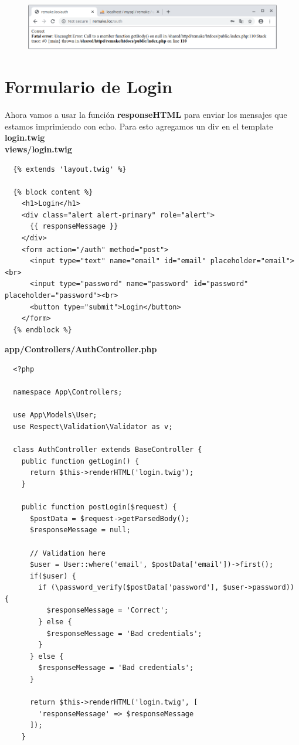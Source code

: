 \documentclass{article}
\begin{document}
\begin{figure}[h!]
  \centering
  \includegraphics[scale=0.5]{./Pictures/205_login_correct.png}
\end{figure}

\newpage

\section{Formulario de Login}%

Ahora vamos a usar la función \textbf{responseHTML} para enviar los mensajes
que estamos imprimiendo con echo. Para esto agregamos un div en el template
\textbf{login.twig}\\

\textbf{views/login.twig}
\begin{verbatim}
  {% extends 'layout.twig' %}

  {% block content %}
    <h1>Login</h1>
    <div class="alert alert-primary" role="alert">
      {{ responseMessage }}
    </div>
    <form action="/auth" method="post">
      <input type="text" name="email" id="email" placeholder="email"><br>
      <input type="password" name="password" id="password" placeholder="password"><br>
      <button type="submit">Login</button>
    </form>
  {% endblock %}
\end{verbatim}

\textbf{app/Controllers/AuthController.php}
\begin{verbatim}
  <?php

  namespace App\Controllers;

  use App\Models\User;
  use Respect\Validation\Validator as v;

  class AuthController extends BaseController {
    public function getLogin() {
      return $this->renderHTML('login.twig');
    }

    public function postLogin($request) {
      $postData = $request->getParsedBody();
      $responseMessage = null;

      // Validation here
      $user = User::where('email', $postData['email'])->first();
      if($user) {
        if (\password_verify($postData['password'], $user->password)) {
          $responseMessage = 'Correct';
        } else {
          $responseMessage = 'Bad credentials';
        }
      } else {
        $responseMessage = 'Bad credentials';
      }

      return $this->renderHTML('login.twig', [
        'responseMessage' => $responseMessage
      ]);
    }
\end{verbatim}
\end{document}

